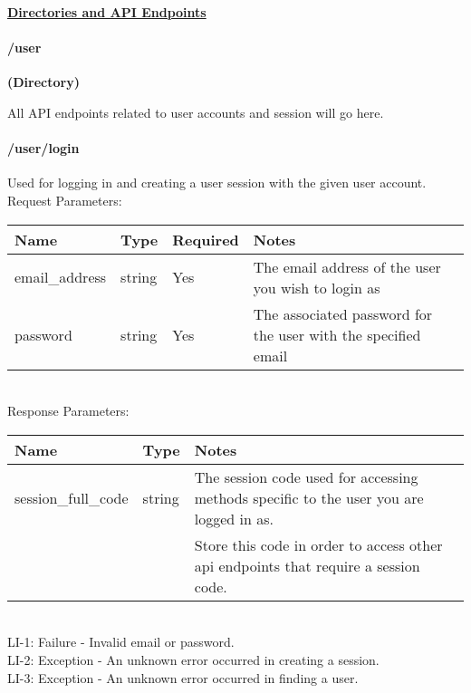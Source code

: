 \documentclass{article}[11pt]
\begin{document}
\noindent
\textbf{\underline{Directories and API Endpoints}} \\

\paragraph{/user}\textbf{ (Directory) }

All API endpoints related to user accounts and session will go here.


\paragraph{/user/login}\textbf{}

Used for logging in and creating a user session with the given user account. \\

\noindent
Request Parameters:

\noindent
\begin{tabular}{|l|l|l|l|}
\hline
\textbf{Name} & \textbf{Type} & \textbf{Required} & \textbf{Notes} \\
\hline
email\_address & string & Yes & The email address of the user you wish to login as \\
\hline
password & string & Yes & The associated password for the user with the specified email \\
\hline
\end{tabular} \\

\noindent
Response Parameters:

\noindent
\begin{tabular}{|l|l|l|}
\hline
\textbf{Name} & \textbf{Type} & \textbf{Notes} \\
\hline
session\_full\_code & string & The session code used for accessing methods specific to the user you are logged in as. \\
& & Store this code in order to access other api endpoints that require a session code. \\
\hline
\end{tabular} \\

\ErrorsMysql
LI-1: Failure - Invalid email or password. \\
LI-2: Exception - An unknown error occurred in creating a session. \\
LI-3: Exception - An unknown error occurred in finding a user.
\end{document}
